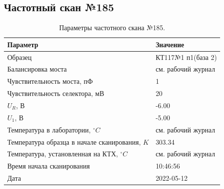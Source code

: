 \subsection{Частотный скан №185}
\begin{table}[!ht]
    \centering
    \caption{Параметры частотного скана №185.}
    \begin{tabular}{|l|l|}
        \hline
        Параметр                                       & Значение                  \\ \hline
        Образец                                        & КТ117№1 п1(база 2)        \\ \hline
        Балансировка моста                             & см. рабочий журнал        \\ \hline
        Чувствительность моста, пФ                     & 1                         \\ \hline
        Чувствительность селектора, мВ                 & 20                        \\ \hline
        $U_R$, В                                       & -6.00                     \\ \hline
        $U_1$, В                                       & -5.00                     \\ \hline
        Температура в лаборатории, $^\circ C$          & см. рабочий журнал        \\ \hline
        Температура образца в начале сканирования, $K$ & 303.34                    \\ \hline
        Температура, установленная на КТХ, $^\circ C$  & см. рабочий журнал        \\ \hline
        Время начала сканирования                      & 10:46:56                  \\ \hline
        Дата                                           & 2022-05-12                \\ \hline
    \end{tabular}
    \label{table:frequency_scan_185}
\end{table}

